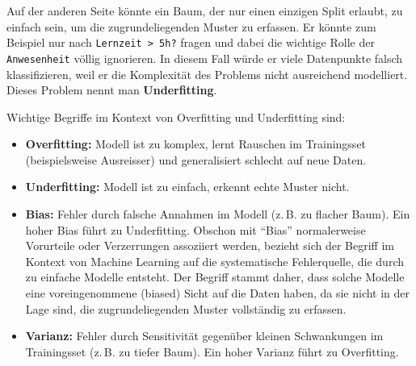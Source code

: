 \begin{myattention}[Underfitting]
    Auf der anderen Seite könnte ein Baum, der nur einen einzigen Split erlaubt, zu einfach sein, um die zugrundeliegenden Muster zu erfassen. Er könnte zum Beispiel nur nach \texttt{Lernzeit > 5h?} fragen und dabei die wichtige Rolle der \texttt{Anwesenheit} völlig ignorieren. In diesem Fall würde er viele Datenpunkte falsch klassifizieren, weil er die Komplexität des Problems nicht ausreichend modelliert. Dieses Problem nennt man \textbf{Underfitting}.
\end{myattention}

\begin{mydefinition}
    Wichtige Begriffe im Kontext von Overfitting und Underfitting sind:
    \begin{itemize}
        \item \textbf{Overfitting:} Modell ist zu komplex, lernt Rauschen im Trainingsset (beispielsweise Ausreisser) und generalisiert schlecht auf neue Daten.
        \item \textbf{Underfitting:} Modell ist zu einfach, erkennt echte Muster nicht.
        \item \textbf{Bias:} Fehler durch falsche Annahmen im Modell (z.\,B. zu flacher Baum). Ein hoher Bias führt zu Underfitting. Obschon mit \enquote{Bias} normalerweise Vorurteile oder Verzerrungen assoziiert werden, bezieht sich der Begriff im Kontext von Machine Learning auf die systematische Fehlerquelle, die durch zu einfache Modelle entsteht. Der Begriff stammt daher, dass solche Modelle eine voreingenommene (biased) Sicht auf die Daten haben, da sie nicht in der Lage sind, die zugrundeliegenden Muster vollständig zu erfassen.
        \item \textbf{Varianz:} Fehler durch Sensitivität gegenüber kleinen Schwankungen im Trainingsset (z.\,B. zu tiefer Baum). Ein hoher Varianz führt zu Overfitting.
    \end{itemize}
\end{mydefinition}

